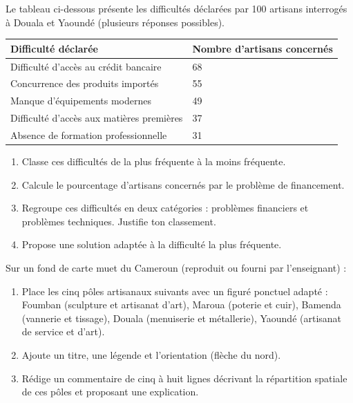 \documentclass[11pt]{article}
\begin{document}
\begin{exercice}
Le tableau ci-dessous présente les difficultés déclarées par 100 artisans interrogés à Douala et Yaoundé (plusieurs réponses possibles).
\begin{center}
\begin{tabularx}{\linewidth}{|l|X|}\hline
\rowcolor{popblueL} Difficulté déclarée & Nombre d'artisans concernés \\ \hline
Difficulté d'accès au crédit bancaire & 68 \\ \hline
Concurrence des produits importés & 55 \\ \hline
Manque d'équipements modernes & 49 \\ \hline
Difficulté d'accès aux matières premières & 37 \\ \hline
Absence de formation professionnelle & 31 \\ \hline
\end{tabularx}
\end{center}
\begin{enumerate}
\item Classe ces difficultés de la plus fréquente à la moins fréquente.
\item Calcule le pourcentage d'artisans concernés par le problème de financement.
\item Regroupe ces difficultés en deux catégories : problèmes financiers et problèmes techniques. Justifie ton classement.
\item Propose une solution adaptée à la difficulté la plus fréquente.
\end{enumerate}
\end{exercice}

\begin{exercice}
Sur un fond de carte muet du Cameroun (reproduit ou fourni par l'enseignant) :
\begin{enumerate}
\item Place les cinq pôles artisanaux suivants avec un figuré ponctuel adapté : Foumban (sculpture et artisanat d'art), Maroua (poterie et cuir), Bamenda (vannerie et tissage), Douala (menuiserie et métallerie), Yaoundé (artisanat de service et d'art).
\item Ajoute un titre, une légende et l'orientation (flèche du nord).
\item Rédige un commentaire de cinq à huit lignes décrivant la répartition spatiale de ces pôles et proposant une explication.
\end{enumerate}
\end{exercice}
\end{document}
